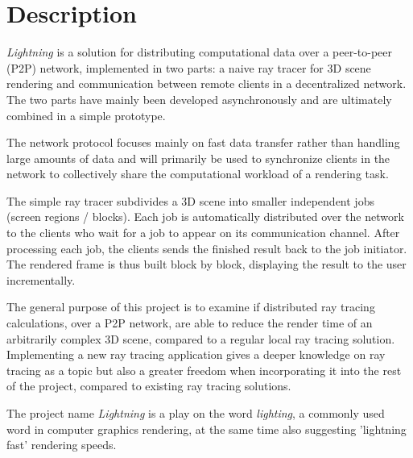 \chapter{Description}


\emph{Lightning} is a solution for distributing computational data over a peer-to-peer (P2P) network, implemented in two parts: a naive ray tracer for 3D scene rendering and communication between remote clients in a decentralized network. The two parts have mainly been developed asynchronously and are ultimately combined in a simple prototype. 

The network protocol focuses mainly on fast data transfer rather than handling
large amounts of data and will primarily be used to synchronize clients in the
network to collectively share the computational workload of a rendering task.

The simple ray tracer subdivides a 3D scene into smaller independent jobs
(screen regions / blocks). Each job is automatically distributed over the
network to the clients who wait for a job to appear on its communication
channel. After processing each job, the clients sends the finished result back
to the job initiator. The rendered frame is thus built block by block,
displaying the result to the user incrementally. 

The general purpose of this project is to examine if distributed ray tracing calculations, over a P2P network, are able to reduce the render time of an arbitrarily complex 3D scene, compared to a regular local ray tracing solution. Implementing a new ray tracing application gives a deeper knowledge on ray tracing as a topic but also a greater freedom when incorporating it into the rest of the project, compared to existing ray tracing solutions.

The project name \emph{Lightning} is a play on the word \emph{lighting}, a commonly used word in computer graphics rendering, at the same time also suggesting 'lightning fast' rendering speeds. %

